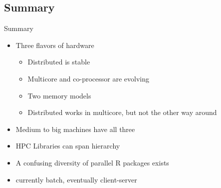 \subsection{Summary}
\makesubcontentsslidessec

\begin{frame}
  \begin{block}{Summary}
    \begin{itemize}
    \item Three flavors of hardware
      \begin{itemize}
      \item Distributed is stable
      \item Multicore and co-processor are evolving
      \item Two memory models
      \item Distributed works in multicore, but not the other way around
      \end{itemize}
    \item Medium to big machines have all three
    \item HPC Libraries can span hierarchy
    \item A confusing diversity of parallel R packages exists
    \item \pbdR currently batch, eventually client-server
    \end{itemize}
  \end{block}
\end{frame}